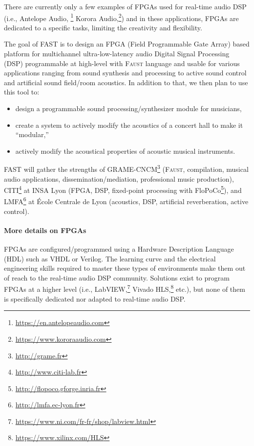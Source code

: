 \documentclass[a4paper,10pt]{article}
\newcommand{\F}{\textsc{Faust}}
\newcommand{\PP}{FAST}
\begin{document}
There are currently only a few examples of FPGAs used for real-time audio DSP (i.e., Antelope Audio, \footnote{\url{https://en.antelopeaudio.com}} Korora Audio,\footnote{\url{https://www.kororaaudio.com}}) and in these applications, FPGAs are dedicated to a specific tasks, limiting the creativity and flexibility.


The goal of \PP{} is to design an FPGA (Field Programmable Gate Array) based platform for multichannel ultra-low-latency audio Digital Signal Processing (DSP) programmable at high-level with \F{} language and usable for various applications ranging from sound synthesis and processing to active sound control and artificial sound field/room acoustics. In addition to that, we then plan to use this tool to: 

\begin{itemize}
  \itemsep0em
  \item design a programmable sound processing/synthesizer module for musicians, 
  \item create a system to actively modify the acoustics of a concert hall to make it ``modular,''
  \item actively modify the acoustical properties of acoustic musical instruments. 
\end{itemize}
\PP{} will gather the strengths of GRAME-CNCM\footnote{\url{http://grame.fr}} (\F{}, compilation, musical audio applications, dissemination/mediation, professional music production), CITI\footnote{\url{http://www.citi-lab.fr}} at INSA Lyon (FPGA, DSP, fixed-point processing with FloPoCo\footnote{\url{http://flopoco.gforge.inria.fr}}), and LMFA\footnote{\url{http://lmfa.ec-lyon.fr}} at École Centrale de Lyon (acoustics, DSP, artificial reverberation, active control).

\paragraph{More details on FPGAs}
FPGAs are configured/programmed using a Hardware Description Language (HDL) such as VHDL or Verilog. The learning curve and the electrical engineering skills required to master these types of environments make them out of reach to the real-time audio DSP community. Solutions exist to program FPGAs at a higher level (i.e., LabVIEW,\footnote{\url{https://www.ni.com/fr-fr/shop/labview.html}} Vivado HLS,\footnote{\url{https://www.xilinx.com/HLS}} etc.), but none of them is specifically dedicated nor adapted to real-time audio DSP. 
\end{document}
